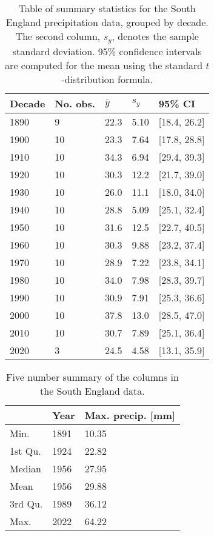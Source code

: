 \documentclass[12pt, a4paper]{article}
\begin{document}
  \begin{table}
    \centering
    \caption{Table of summary statistics for the South England precipitation
    data, grouped by decade. The second column, \(s_y\), denotes the sample
    standard deviation. 95\% confidence intervals are computed for the mean 
    using the standard \(t\)-distribution formula.}
    \begin{tabularx}{\textwidth}{XXXXX}
      \toprule
      Decade & No. obs. & \(\overline y\)  & \(s_y\) & 95\% CI      \\
      \midrule
      1890   &  9       & 22.3             & 5.10    & [18.4, 26.2] \\
      1900   & 10       & 23.3             & 7.64    & [17.8, 28.8] \\
      1910   & 10       & 34.3             & 6.94    & [29.4, 39.3] \\
      1920   & 10       & 30.3             & 12.2    & [21.7, 39.0] \\
      1930   & 10       & 26.0             & 11.1    & [18.0, 34.0] \\
      1940   & 10       & 28.8             & 5.09    & [25.1, 32.4] \\
      1950   & 10       & 31.6             & 12.5    & [22.7, 40.5] \\
      1960   & 10       & 30.3             & 9.88    & [23.2, 37.4] \\
      1970   & 10       & 28.9             & 7.22    & [23.8, 34.1] \\
      1980   & 10       & 34.0             & 7.98    & [28.3, 39.7] \\
      1990   & 10       & 30.9             & 7.91    & [25.3, 36.6] \\
      2000   & 10       & 37.8             & 13.0    & [28.5, 47.0] \\
      2010   & 10       & 30.7             & 7.89    & [25.1, 36.4] \\
      2020   &  3       & 24.5             & 4.58    & [13.1, 35.9] \\
      \bottomrule
    \end{tabularx}
    \label{tab:precip_summary}
  \end{table}

  \begin{table}
    \centering
    \caption{Five number summary of the columns in the South England data.}
    \begin{tabularx}{\textwidth}{XXX}
      \toprule
              & Year & Max. precip. [mm] \\
      \midrule
      Min.    & 1891 & 10.35             \\
      1st Qu. & 1924 & 22.82             \\
      Median  & 1956 & 27.95             \\
      Mean    & 1956 & 29.88             \\
      3rd Qu. & 1989 & 36.12             \\
      Max.    & 2022 & 64.22             \\
      \bottomrule
    \end{tabularx}
  \end{table}
  
\end{document}
